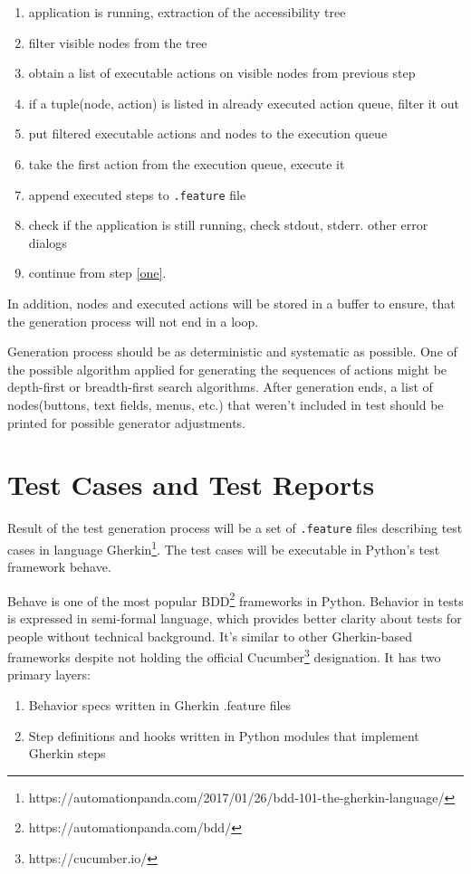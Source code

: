 \begin{enumerate}
    \item\label{one} application is running, extraction of the accessibility tree
    \item filter visible nodes from the tree 
    \item obtain a list of executable actions on visible nodes from previous step
    \item if a tuple(node, action) is listed in already executed action queue, filter it out  
    \item put filtered executable actions and nodes to the execution queue
    \item take the first action from the execution queue, execute it
    \item append executed steps to \verb|.feature| file 
    \item check if the application is still running, check stdout, stderr. other error dialogs
    \item continue from step \ref{one}.
\end{enumerate}

In addition, nodes and executed actions will be stored in a buffer to ensure, that the generation process will not end in a loop. 

Generation process should be as deterministic and systematic as possible. One of the possible algorithm applied for generating the sequences of actions might be depth-first or breadth-first search algorithms. After generation ends, a list of nodes(buttons, text fields, menus, etc.) that weren't included in test should be printed for possible generator adjustments. 

\section{Test Cases and Test Reports}
Result of the test generation process will be a set of \verb|.feature| files describing test cases in language Gherkin\footnote{https://automationpanda.com/2017/01/26/bdd-101-the-gherkin-language/}. The test cases will be executable in Python's test framework behave. 

Behave is one of the most popular BDD\footnote{https://automationpanda.com/bdd/} frameworks in Python. Behavior in tests is expressed in semi-formal language, which provides better clarity about tests for people without technical background.\cite{pythonframeworks} It's similar to other Gherkin-based frameworks despite not holding the official Cucumber\footnote{https://cucumber.io/} designation. It has two primary layers:
\begin{enumerate}
    \item Behavior specs written in Gherkin .feature files
    \item Step definitions and hooks written in Python modules that implement Gherkin steps
\end{enumerate}

